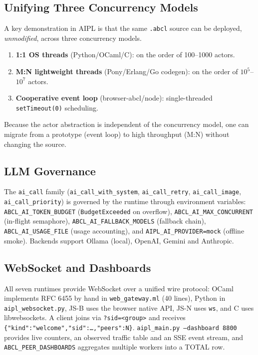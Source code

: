 \documentclass[11pt,a4paper]{article}
\newcommand{\code}[1]{\texttt{\small #1}}
\begin{document}
\subsection{Unifying Three Concurrency Models}
A key demonstration in AIPL is that the same \code{.abcl} source can be
deployed, \emph{unmodified}, across three concurrency models.
\begin{enumerate}[leftmargin=1.6em,itemsep=2pt]
  \item \textbf{1:1 OS threads} (Python/OCaml/C):
        on the order of 100--1000 actors.
  \item \textbf{M:N lightweight threads} (Pony/Erlang/Go codegen):
        on the order of $10^5$--$10^7$ actors.
  \item \textbf{Cooperative event loop} (browser-abcl/node):
        single-threaded \code{setTimeout(0)} scheduling.
\end{enumerate}
Because the actor abstraction is independent of the concurrency model,
one can migrate from a prototype (event loop) to high throughput (M:N)
without changing the source.

\subsection{LLM Governance}\label{sec:llm}
The \code{ai\_call} family (\code{ai\_call\_with\_system},
\code{ai\_call\_retry}, \code{ai\_call\_image}, \code{ai\_call\_priority})
is governed by the runtime through environment variables:
\code{ABCL\_AI\_TOKEN\_BUDGET} (\code{BudgetExceeded} on overflow),
\code{ABCL\_AI\_MAX\_CONCURRENT} (in-flight semaphore),
\code{ABCL\_AI\_FALLBACK\_MODELS} (fallback chain),
\code{ABCL\_AI\_USAGE\_FILE} (usage accounting), and
\code{AIPL\_AI\_PROVIDER=mock} (offline smoke).
Backends support Ollama (local), OpenAI, Gemini and Anthropic.

\subsection{WebSocket and Dashboards}
All seven runtimes provide WebSocket over a unified wire protocol:
OCaml implements RFC 6455 by hand in \code{web\_gateway.ml} (40 lines),
Python in \code{aipl\_websocket.py}, JS-B uses the browser native API,
JS-N uses \code{ws}, and C uses libwebsockets. A client joins via
\code{?sid=<group>} and receives
\code{\{"kind":"welcome","sid":\dots,"peers":N\}}.
\code{aipl\_main.py --dashboard 8800} provides live counters, an observed
traffic table and an SSE event stream, and
\code{ABCL\_PEER\_DASHBOARDS} aggregates multiple workers into a TOTAL
row.
\end{document}
